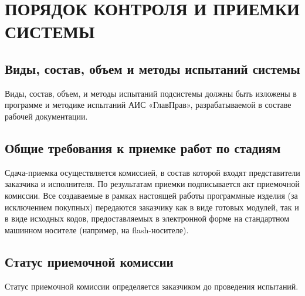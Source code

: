 \documentclass[russian, utf8, 12pt,pointsubsection,floatsubsection]{eskdtext}
\begin{document}
\section{ПОРЯДОК КОНТРОЛЯ И ПРИЕМКИ СИСТЕМЫ}
\subsection{Виды, состав, объем и методы испытаний системы}
Виды, состав, объем, и методы испытаний подсистемы должны быть изложены в программе и методике испытаний АИС «ГлавПрав», разрабатываемой в составе рабочей документации.
\subsection{Общие требования к приемке работ по стадиям}
Сдача-приемка осуществляется комиссией, в состав которой входят представители заказчика и исполнителя. По результатам приемки подписывается акт приемочной комиссии. Все создаваемые в рамках настоящей работы программные изделия (за исключением покупных) передаются заказчику как в виде готовых модулей, так и в виде исходных кодов, предоставляемых в электронной форме на стандартном машинном носителе (например, на flash-носителе).
\subsection{Статус приемочной комиссии}
Статус приемочной комиссии определяется заказчиком до проведения испытаний.
\end{document}
